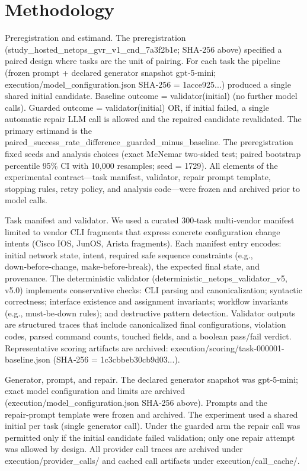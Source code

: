 \documentclass[conference]{IEEEtran}
\begin{document}
\section{Methodology}
Preregistration and estimand. The preregistration (study\_hosted\_netops\_gvr\_v1\_cnd\_7a3f2b1e; SHA‑256 above) specified a paired design where tasks are the unit of pairing. For each task the pipeline (frozen prompt + declared generator snapshot gpt‑5‑mini; execution/model\_configuration.json SHA‑256 = 1acce925...) produced a single shared initial candidate. Baseline outcome = validator(initial) (no further model calls). Guarded outcome = validator(initial) OR, if initial failed, a single automatic repair LLM call is allowed and the repaired candidate revalidated. The primary estimand is the paired\_success\_rate\_difference\_guarded\_minus\_baseline. The preregistration fixed seeds and analysis choices (exact McNemar two‑sided test; paired bootstrap percentile 95\% CI with 10,000 resamples; seed = 1729). All elements of the experimental contract---task manifest, validator, repair prompt template, stopping rules, retry policy, and analysis code---were frozen and archived prior to model calls.

Task manifest and validator. We used a curated 300‑task multi‑vendor manifest limited to vendor CLI fragments that express concrete configuration change intents (Cisco IOS, JunOS, Arista fragments). Each manifest entry encodes: initial network state, intent, required safe sequence constraints (e.g., down‑before‑change, make‑before‑break), the expected final state, and provenance. The deterministic validator (deterministic\_netops\_validator\_v5, v5.0) implements conservative checks: CLI parsing and canonicalization; syntactic correctness; interface existence and assignment invariants; workflow invariants (e.g., must‑be‑down rules); and destructive pattern detection. Validator outputs are structured traces that include canonicalized final configurations, violation codes, parsed command counts, touched fields, and a boolean pass/fail verdict. Representative scoring artifacts are archived: execution/scoring/task-000001-baseline.json (SHA‑256 = 1c3cbbeb30cb9d03...).

Generator, prompt, and repair. The declared generator snapshot was gpt‑5‑mini; exact model configuration and limits are archived (execution/model\_configuration.json SHA‑256 above). Prompts and the repair‑prompt template were frozen and archived. The experiment used a shared initial per task (single generator call). Under the guarded arm the repair call was permitted only if the initial candidate failed validation; only one repair attempt was allowed by design. All provider call traces are archived under execution/provider\_calls/ and cached call artifacts under execution/call\_cache/.
\end{document}
